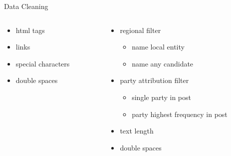 \begin{frame}{Data Cleaning}
	\begin{columns}
		
		\begin{column}{0.55\textwidth}
			\begin{tcolorbox}[enhanced jigsaw, colback=white, opacityback=.4,  colframe=ElixirPurple, arc=3mm, boxrule=0mm, height=0.8\textheight, valign=center, title=Text Cleaning]
				
				\begin{itemize}
					\item html tags
					\item links
					\item special characters
					\item double spaces
				\end{itemize}
				
				
			\end{tcolorbox}
		\end{column}
		
		\begin{column}{0.55\textwidth}
			\begin{tcolorbox}[enhanced jigsaw, colback=white, opacityback=.4, colframe=ElixirPurple, arc=3mm, boxrule=0mm, height=0.8\textheight, valign=center, title=Post Selection]
				
				\begin{itemize}
					\item regional filter
					\begin{itemize}
						\item name local entity
						\item name any candidate
					\end{itemize}
					\item party attribution filter
					\begin{itemize}
						\item single party in post
						\item party highest frequency in post
					\end{itemize}
					\item text length
					\item double spaces
				\end{itemize}
				
				
			\end{tcolorbox}
		\end{column}
	\end{columns}
\end{frame}



